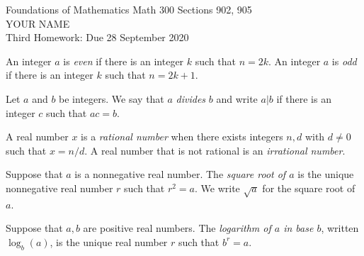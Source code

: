 \documentclass[12pt]{article}
\newcommand{\defn}[1]{{\color{blue}\sl #1}}
\newcommand{\deco}[1]{{\color{blue} #1}}
\begin{document}
\LARGE 
\noindent
{\color{Maroon}Foundations of Mathematics \hfill Math 300 Sections 902, 905}\vspace{2pt}\\
\Large YOUR NAME\vspace{2pt}\\
\large
Third Homework: \hfill Due 28 September 2020
\normalsize    %
\vspace{10pt}  %

\noindent{\color{blue}\rule{500pt}{2pt}}

 An integer $a$ is \defn{even} if there is an integer $k$ such that $n=2k$.
An integer $a$ is \defn{odd} if there is an integer $k$ such that $n=2k{+}1$.

 Let $a$ and $b$ be integers.
We say that $a$ \defn{divides} $b$ and write $a|b$ if there is an integer $c$ such that $ac=b$.

A real number $x$ is a \defn{rational number} when there exists integers $n,d$ with $d\neq 0$ such that  $x=n/d$.
  A real number that is not rational is an \defn{irrational number}.


Suppose that $a$ is a nonnegative real number.
The \defn{square root of $a$} is the unique nonnegative real number $r$ such that $r^2=a$.
We write \deco{$\sqrt{a}$} for the square root of $a$.

Suppose that $a,b$ are positive real numbers.
The \defn{logarithm of $a$ in base $b$}, written \defn{$\log_b(a)$}, is the unique real number $r$ such that $b^r=a$.

  
  
\end{document}
